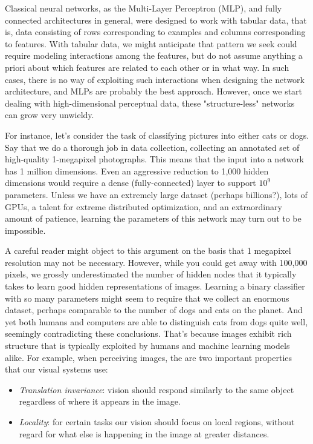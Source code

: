 Classical neural networks, as the Multi-Layer Perceptron (MLP), and fully connected architectures in general, were designed to work with tabular data, that is, data consisting of rows corresponding to examples and columns corresponding to features. With tabular data, we might anticipate that pattern we seek could require modeling interactions among the features, but do not assume anything a priori about which features are related to each other or in what way. In such cases, there is no way of exploiting such interactions when designing the network architecture, and MLPs are probably the best approach. However, once we start dealing with high-dimensional perceptual data, these "structure-less" networks can grow very unwieldy. 

For instance, let’s consider the task of classifying pictures into either cats or dogs. Say that we do a thorough job in data collection, collecting an annotated set of high-quality 1-megapixel photographs. This means that the input into a network has 1 million dimensions. Even an aggressive reduction to 1,000 hidden dimensions would require a dense (fully-connected) layer to support  $10^9$  parameters. Unless we have an extremely large dataset (perhaps billions?), lots of GPUs, a talent for extreme distributed optimization, and an extraordinary amount of patience, learning the parameters of this network may turn out to be impossible.

A careful reader might object to this argument on the basis that 1 megapixel resolution may not be necessary. However, while you could get away with 100,000 pixels, we grossly underestimated the number of hidden nodes that it typically takes to learn good hidden representations of images. Learning a binary classifier with so many parameters might seem to require that we collect an enormous dataset, perhaps comparable to the number of dogs and cats on the planet. And yet both humans and computers are able to distinguish cats from dogs quite well, seemingly contradicting these conclusions. That’s because images exhibit rich structure that is typically exploited by humans and machine learning models alike. For example, when perceiving images, the are two important properties that our visual systems use:

\begin{itemize}
    \item \textit{Translation invariance}: vision should respond similarly to the same object regardless of where it appears in the image.
    \item \textit{Locality}: for certain tasks our vision should focus on local regions, without regard for what else is happening in the image at greater distances.
\end{itemize}

